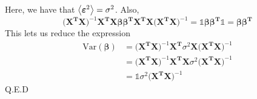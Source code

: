 \documentclass[10pt]{revtex4-2}
\begin{document}
Here, we have that $\expval{\bm{\varepsilon}^2}=\sigma^2$. Also, 
$$ \big(\bm{X^T}\bm{X}\big)^{-1}\bm{X^T}\bm{X}
	\bm{\beta}\bm{\beta^T}
	\bm{X^T}\bm{X}\big(\bm{X^T}\bm{X}\big)^{-1} 
	= \mathbb{1}\bm{\beta}\bm{\beta^T}\mathbb{1} = \bm{\beta}\bm{\beta^T}$$
This lets us reduce the expression 
\begin{align}
	 \mbox{Var}(\bm{\beta}) &= 
		\big(\bm{X^T}\bm{X}\big)^{-1}\bm{X^T} \sigma^2
		\bm{X}\big(\bm{X^T}\bm{X}\big)^{-1}\\
	&= \big(\bm{X^T}\bm{X}\big)^{-1}\bm{X^T}\bm{X}
		\sigma^2\big(\bm{X^T}\bm{X}\big)^{-1}\\
	&= \mathbb{1}\sigma^2\big(\bm{X^T}\bm{X}\big)^{-1}
\end{align}
Q.E.D
%
\end{document}
